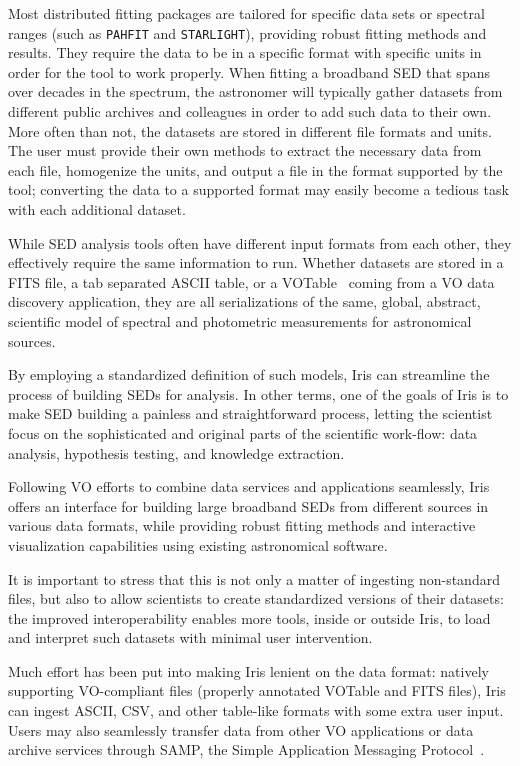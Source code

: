 \documentclass[final,5p,authoryear]{elsarticle}
\begin{document}
Most distributed fitting packages are tailored for specific data sets or
spectral ranges (such as \texttt{PAHFIT} and \texttt{STAR\-LIGHT}), providing robust
fitting methods and results. They require the data to be in a specific format
with specific units in order for the tool to work properly. When fitting a
broadband SED that spans over decades in the spectrum, the astronomer will
typically gather datasets from different public archives and colleagues in order
to add such data to their own. More often than not, the datasets are stored in
different file formats and units. 
The user must provide their own methods to extract the necessary data from each
file, homogenize the units, and output a file in the format supported by the
tool; converting the data to a supported format may easily become a tedious task
with each additional dataset.

While SED analysis tools often have different input formats from each other,
they effectively require the same information to run. Whether datasets are
stored in a FITS file, a tab separated ASCII table, or a VOTable~\citep{2011arXiv1110.0524O} coming from a
VO data discovery application, they are all serializations of the same, global,
abstract, scientific model of spectral and photometric measurements for
astronomical sources.

By employing a standardized definition of such models, Iris can streamline
the process of building SEDs for analysis. In other terms, one of the goals of
Iris is to make SED building a painless and straightforward process, letting the
scientist focus on the sophisticated and original parts of the scientific
work-flow: data analysis, hypothesis testing, and knowledge extraction.

Following VO efforts to combine data services and applications seamlessly, Iris
offers an interface for building large broadband SEDs from different sources in
various data formats, while providing robust fitting methods and interactive
visualization capabilities using existing astronomical software.

It is important to stress that this is not only a matter of ingesting
non-standard files, but also to allow scientists to create standardized versions
of their datasets: the improved interoperability enables more tools, inside or
outside Iris, to load and interpret such datasets with minimal user
intervention.

Much effort has been put into making Iris lenient on the data format: natively
supporting VO-compliant files (properly annotated
VOTable and FITS files), Iris can ingest ASCII, CSV,
and other table-like formats with some extra user input. Users may also
seamlessly transfer data from other VO applications or data archive services
through SAMP, the Simple Application Messaging
Protocol~\citep{2011arXiv1110.0528T}.
\end{document}
